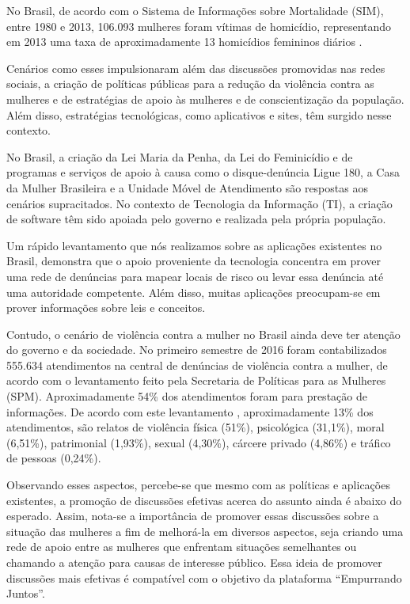 No Brasil, de acordo com o Sistema de Informações sobre Mortalidade (SIM), entre 1980 e 2013, 106.093 mulheres foram vítimas de homicídio, 
representando em 2013 uma taxa de aproximadamente 13 homicídios femininos
diários \cite{mapa_violencia_2015}. 

Cenários como esses impulsionaram além das discussões promovidas nas redes sociais, a criação de políticas públicas para a redução da violência 
contra as mulheres e de estratégias de apoio às mulheres e de conscientização da população. Além disso, estratégias tecnológicas, 
como aplicativos e sites, têm surgido nesse contexto.

No Brasil, a criação da Lei Maria da Penha, da Lei do Feminicídio e de programas e serviços de apoio à causa 
como o disque-denúncia Ligue 180, a Casa da Mulher Brasileira e a Unidade Móvel de Atendimento são respostas aos cenários supracitados. 
No contexto de Tecnologia da Informação (TI), a criação de software têm sido apoiada pelo governo e realizada pela própria população.

Um rápido levantamento que nós realizamos sobre as aplicações existentes no Brasil, demonstra que o apoio proveniente da tecnologia concentra em 
prover uma rede de denúncias para mapear locais de risco ou levar essa denúncia até uma autoridade competente. Além disso, muitas aplicações 
preocupam-se em prover informações sobre leis e conceitos.

Contudo, o cenário de violência contra a mulher no Brasil ainda deve ter atenção do governo e da sociedade. No primeiro semestre de 2016 
foram contabilizados 555.634 atendimentos na central de denúncias 
de violência contra a mulher, de acordo com o levantamento feito pela Secretaria de Políticas para as Mulheres (SPM). 
Aproximadamente 54\% dos atendimentos foram para prestação de informações. De acordo com este levantamento \cite{portal_180}, aproximadamente 13\% dos atendimentos, 
são relatos de violência física (51\%), psicológica (31,1\%), moral (6,51\%), patrimonial (1,93\%), sexual (4,30\%), cárcere privado (4,86\%) e 
tráfico de pessoas (0,24\%).

Observando esses aspectos, percebe-se que mesmo com as políticas e aplicações existentes, a promoção de discussões efetivas acerca do 
assunto ainda é abaixo do esperado. Assim, nota-se a importância de promover essas discussões sobre a situação das mulheres a fim de 
melhorá-la em diversos aspectos, seja criando uma rede de apoio entre as mulheres que enfrentam situações semelhantes ou chamando a atenção 
para causas de interesse público. Essa ideia de promover discussões mais efetivas é compatível com o objetivo da plataforma ``Empurrando Juntos''.

